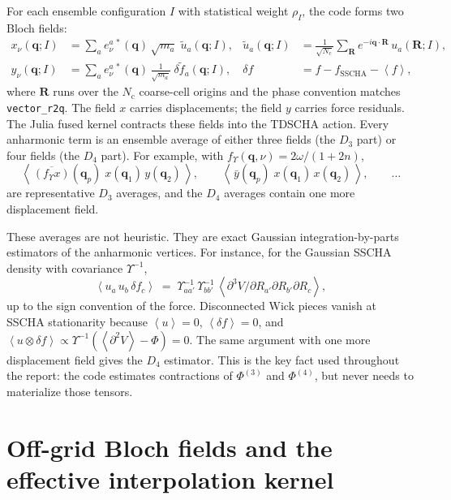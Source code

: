 \documentclass[11pt,a4paper]{article}
\newcommand{\qv}{\mathbf{q}}
\newcommand{\Rv}{\mathbf{R}}
\newcommand{\avg}[1]{\left\langle #1 \right\rangle}
\newcommand{\Nc}{N_{\mathrm{c}}}
\newcommand{\fY}{f_{\Upsilon}}
\begin{document}
For each ensemble configuration $I$ with statistical weight $\rho_I$, the
code forms two Bloch fields:
\begin{align}
x_\nu(\qv; I) &= \sum_a e^{a\,*}_\nu(\qv)\, \sqrt{m_a}\;
  \tilde u_a(\qv; I),
&
\tilde u_a(\qv;I) &= \frac{1}{\sqrt{\Nc}} \sum_{\Rv} e^{-i \qv\cdot\Rv}\,
  u_a(\Rv; I),
\label{eq:blochfields}
\\
y_\nu(\qv; I) &= \sum_a e^{a\,*}_\nu(\qv)\, \frac{1}{\sqrt{m_a}}\;
  \delta\!\tilde f_a(\qv; I),
&
\delta f &= f - f_{\mathrm{SSCHA}} - \avg{f},
\nonumber
\end{align}
where $\Rv$ runs over the $\Nc$ coarse-cell origins and the phase convention
matches \texttt{vector\_r2q}.  The field $x$ carries displacements; the
field $y$ carries force residuals.  The Julia fused kernel contracts these
fields into the TDSCHA action.  Every anharmonic term is an ensemble average
of either three fields (the $D_3$ part) or four fields (the $D_4$ part).
For example, with $\fY(\qv,\nu)=2\omega/(1+2n)$,
\begin{equation}
\avg{\, \overline{(\fY x)}(\qv_p)\; x(\qv_1)\, y(\qv_2) \,},\qquad
\avg{\, \bar y(\qv_p)\; x(\qv_1)\, x(\qv_2) \,},\qquad \dots
\label{eq:d3terms}
\end{equation}
are representative $D_3$ averages, and the $D_4$ averages contain one more
displacement field.

These averages are not heuristic.  They are exact Gaussian
integration-by-parts estimators of the anharmonic vertices.  For instance,
for the Gaussian SSCHA density with covariance $\Upsilon^{-1}$,
\begin{equation}
\avg{u_a\, u_b\, \delta f_c} \;=\;
\Upsilon^{-1}_{aa'}\,\Upsilon^{-1}_{bb'}\,
\avg{\partial^3 V / \partial R_{a'} \partial R_{b'} \partial R_c},
\label{eq:ibp}
\end{equation}
up to the sign convention of the force.  Disconnected Wick pieces vanish at
SSCHA stationarity because $\avg{u}=0$, $\avg{\delta f}=0$, and
$\avg{u\otimes\delta f}\propto
\Upsilon^{-1}(\avg{\partial^2V}-\Phi)=0$.  The same argument with one more
displacement field gives the $D_4$ estimator.  This is the key fact used
throughout the report: the code estimates contractions of $\Phi^{(3)}$ and
$\Phi^{(4)}$, but never needs to materialize those tensors.

\section{Off-grid Bloch fields and the effective interpolation kernel}
\label{sec:offgrid}
\end{document}
